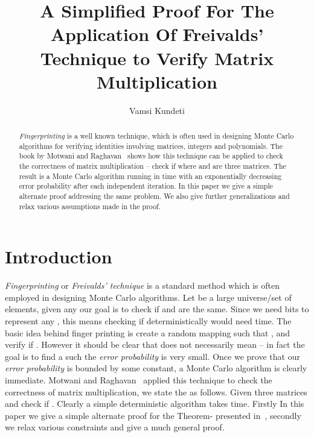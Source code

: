 \documentclass[runningheads]{llncs}
\begin{document}
\title{A Simplified Proof For The Application Of Freivalds' 
Technique to Verify Matrix Multiplication}


\author{Vamsi Kundeti}
 \maketitle

\begin{abstract}
{\em Fingerprinting} is a well known technique, which is often used in
designing Monte Carlo algorithms for verifying identities involving matrices,
integers and polynomials. The book by Motwani and Raghavan~\cite{motwani1995}
shows how this technique can be applied to check the correctness of matrix 
multiplication -- check if  where  and  are three  matrices. 
The result is a Monte Carlo algorithm running in time  with an exponentially 
decreasing error probability after each independent iteration. In this paper we 
give a simple alternate proof addressing the same problem. We also give further 
generalizations and relax various assumptions made in the proof.
\end{abstract}

\section{Introduction}
{\em Fingerprinting} or {\em Freivalds' technique} is a standard method which is often
employed in designing Monte Carlo algorithms. Let  be a large universe/set of elements,
given any  our goal is to check if  and  are the same. Since we need 
 bits to represent any , this means checking if  
deterministically would need  time. The basic idea behind finger printing
is create a random mapping  such that , and verify if .
However it should be clear that  does not necessarily mean  -- in fact the goal is
to find a  such the {\em error probability}  is very small. Once we prove
that our {\em error probability} is bounded by some constant, a Monte Carlo algorithm is clearly
immediate. Motwani and Raghavan~\cite{motwani1995} applied this technique to check the correctness
of matrix multiplication, we state the as follows. Given three  matrices  and  
check if . Clearly a simple deterministic algorithm takes  time. Firstly In 
this paper we give a simple alternate proof for the Theorem- presented in~\cite{motwani1995},
secondly we relax various constraints and give a much general proof.
\end{document}
